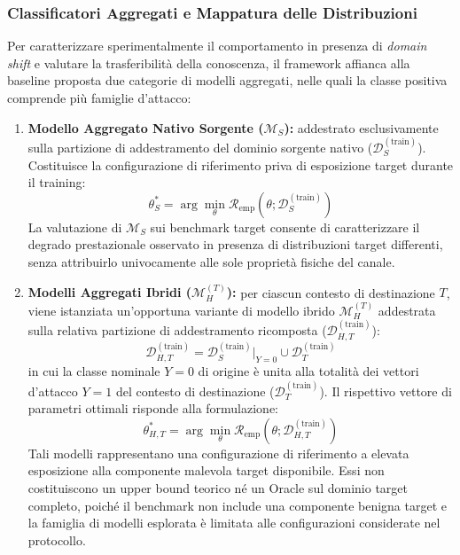 \subsubsection{Classificatori Aggregati e Mappatura delle Distribuzioni}
\label{subsubsec:classificatori_aggregati}
Per caratterizzare sperimentalmente il comportamento in presenza di \textit{domain shift} e valutare la trasferibilità della conoscenza, il framework affianca alla baseline proposta due categorie di modelli aggregati, nelle quali la classe positiva comprende più famiglie d'attacco:
\begin{enumerate}
    \item \textbf{Modello Aggregato Nativo Sorgente ($\mathcal{M}_{S}$):}
    addestrato esclusivamente sulla partizione di addestramento del dominio sorgente nativo ($\mathcal{D}_{S}^{(\text{train})}$). Costituisce la configurazione di riferimento priva di esposizione target durante il training:
    \begin{equation}
        \theta_{S}^* = \arg\min_\theta \mathcal{R}_{\text{emp}}\left(\theta; \mathcal{D}_{S}^{(\text{train})}\right)
        \label{eq:ms_optimization}
    \end{equation}
    La valutazione di $\mathcal{M}_{S}$ sui benchmark target consente di caratterizzare il degrado prestazionale osservato in presenza di distribuzioni target differenti, senza attribuirlo univocamente alle sole proprietà fisiche del canale.
    \item \textbf{Modelli Aggregati Ibridi ($\mathcal{M}_{H}^{(T)}$):}
    per ciascun contesto di destinazione $T$, viene istanziata un'opportuna variante di modello ibrido $\mathcal{M}_{H}^{(T)}$ addestrata sulla relativa partizione di addestramento ricomposta ($\mathcal{D}_{H, T}^{(\text{train})}$):
    \begin{equation}
        \mathcal{D}_{H, T}^{(\text{train})} = \mathcal{D}_{S}^{(\text{train})}\Big|_{Y=0} \cup \mathcal{D}_{T}^{(\text{train})}
        \label{eq:dh_composition}
    \end{equation}
in cui la classe nominale $Y=0$ di origine è unita alla totalità dei vettori d'attacco $Y=1$ del contesto di destinazione ($\mathcal{D}_{T}^{(\text{train})}$). Il rispettivo vettore di parametri ottimali risponde alla formulazione:
    \begin{equation}
        \theta_{H, T}^* = \arg\min_\theta \mathcal{R}_{\text{emp}}\left(\theta; \mathcal{D}_{H, T}^{(\text{train})}\right)
        \label{eq:mh_optimization}
    \end{equation}
    Tali modelli rappresentano una configurazione di riferimento a elevata esposizione alla componente malevola target disponibile. Essi non costituiscono un upper bound teorico né un Oracle sul dominio target completo, poiché il benchmark non include una componente benigna target e la famiglia di modelli esplorata è limitata alle configurazioni considerate nel protocollo.
\end{enumerate}

